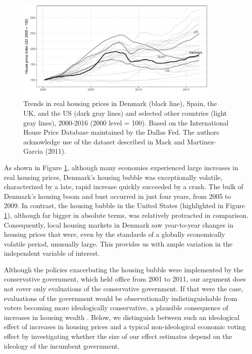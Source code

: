 \documentclass[12pt,a4paper]{article}
\begin{document}
	
	
	\begin{figure}[htbp!]
		\includegraphics[width=0.9\textwidth]{../figures/timeplot}
		\centering
		\caption{Trends in real housing prices in Denmark (black line), Spain, the UK, and the US (dark gray lines) and selected other countries (light gray lines), 2000-2016 (2000 level = 100). Based on the International House Price Database maintained by the Dallas Fed. The authors acknowledge use of the dataset described in Mack and Martinez-Garcia (2011).}\label{hpd}
	\end{figure}
	
	As shown in Figure \ref{hpd}, although many economies experienced large increases in real housing prices, Denmark's housing bubble was exceptionally volatile, characterized by a late, rapid increase quickly succeeded by a crash. The bulk of Denmark's housing boom and bust occurred in just four years, from 2005 to 2009. In contrast, the housing bubble in the United States (highlighted in Figure \ref{hpd}), although far bigger in absolute terms, was relatively protracted in comparison. Consequently, local housing markets in Denmark saw year-to-year changes in housing prices that were, even by the standards of a globally economically volatile period, unusually large. This provides us with ample variation in the independent variable of interest.
	
	
	Although the policies exacerbating the housing bubble were implemented by the conservative government, which held office from 2001 to 2011, our argument does not cover only evaluations of the conservative government. If that were the case, evaluations of the government would be observationally indistinguishable from voters becoming more ideologically conservative, a plausible consequence of increases in housing wealth \citep{ ansell2014political}. Below, we distinguish between such an ideological effect of increases in housing prices and a typical non-ideological economic voting effect by investigating whether the size of our effect estimates depend on the ideology of the incumbent government. 
	
\end{document}
